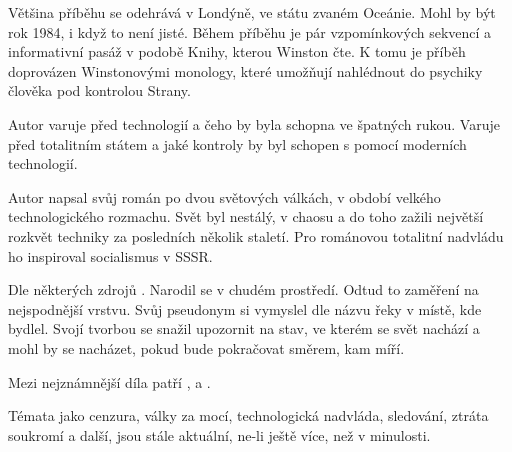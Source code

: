 \documentclass{extarticle} %
\begin{document}
\noindent 
Většina příběhu se odehrává v Londýně, ve státu zvaném Oceánie.
Mohl by být rok 1984, i když to není jisté.
Během příběhu je pár vzpomínkových sekvencí a informativní pasáž v podobě Knihy, kterou Winston čte.
K tomu je příběh doprovázen Winstonovými monology, které umožňují nahlédnout do psychiky člověka pod kontrolou Strany.

\noindent
Autor varuje před technologií a čeho by byla schopna ve špatných rukou.
Varuje před totalitním státem a jaké kontroly by byl schopen s pomocí moderních technologií. 


Autor napsal svůj román po dvou světových válkách, v období velkého technologického rozmachu.
Svět byl nestálý, v chaosu a do toho zažili největší rozkvět techniky za posledních několik staletí.
Pro románovou totalitní nadvládu ho inspiroval socialismus v SSSR.




\noindent 
Dle některých zdrojů .
Narodil se v chudém prostředí.
Odtud to zaměření na nejspodnější vrstvu.
Svůj pseudonym si vymyslel dle názvu řeky v místě, kde bydlel.
Svojí tvorbou se snažil upozornit na stav, ve kterém se svět nachází a mohl by se nacházet, pokud bude pokračovat směrem, kam míří.


\noindent Mezi nejznámnější díla patří ,  a .




\noindent
Témata jako cenzura, války za mocí, technologická nadvláda, sledování,
ztráta soukromí a další, jsou stále aktuální, ne-li ještě více, než v minulosti.
\end{document}

